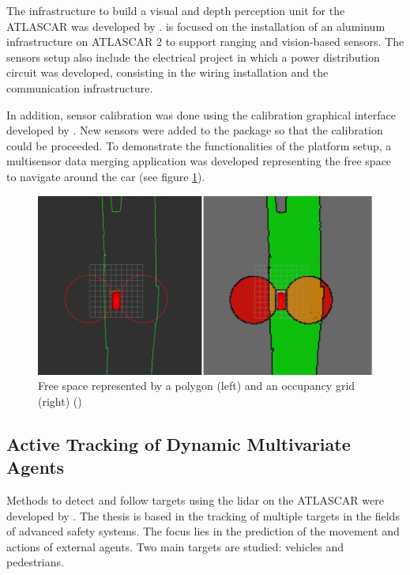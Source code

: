 The infrastructure to build a visual and depth perception unit for the ATLASCAR was developed by \cite{Correia2017}.  is focused on the installation of an aluminum infrastructure on ATLASCAR 2 to support ranging and vision-based sensors. The sensors setup also include the electrical project in which a power distribution circuit was developed, consisting in the wiring installation and the communication infrastructure. 

In addition, sensor calibration was done using the calibration graphical interface developed by \cite{VieiradaSilva2016}. New sensors were added to the package so that the calibration could be proceeded. To demonstrate the functionalities of the platform setup, a multisensor data merging application was developed representing the free space to navigate around the car (see figure \ref{fig:diogo}).

\begin{figure}[htp]
	
	\centering
	\includegraphics[width=1\textwidth]{capstate/imgs/diogo.png}
	
	\caption{Free space represented by a polygon (left) and an occupancy grid (right) (\cite{Correia2017})}
	\label{fig:diogo}
	
\end{figure}

\subsection{Active Tracking of Dynamic Multivariate Agents} 

Methods to detect and follow targets using the \gls{lidar} on the ATLASCAR were developed by  \cite{SoaresDeAlmeida2016a}. The thesis is based in the tracking of multiple targets in the fields of advanced safety systems. The focus lies in the prediction of the movement and actions of external agents. Two main targets are studied: vehicles and pedestrians. 

